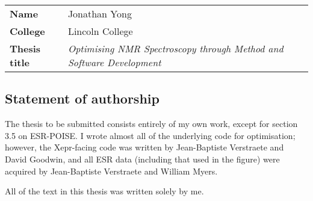 \documentclass[a4paper,12pt]{article}
\begin{document}
\begin{tabular}{ll}
    \textbf{Name}         & Jonathan Yong                                                                \\
    \textbf{College}      & Lincoln College                                                              \\
    \textbf{Thesis title} & \textit{Optimising NMR Spectroscopy through Method and Software Development} \\
\end{tabular}

\subsection*{Statement of authorship}

The thesis to be submitted consists entirely of my own work, except for section 3.5 on ESR-POISE.
I wrote almost all of the underlying code for optimisation; however, the Xepr-facing code was written by Jean-Baptiste Verstraete and David Goodwin, and all ESR data (including that used in the figure) were acquired by Jean-Baptiste Verstraete and William Myers.

All of the text in this thesis was written solely by me.
\end{document}
